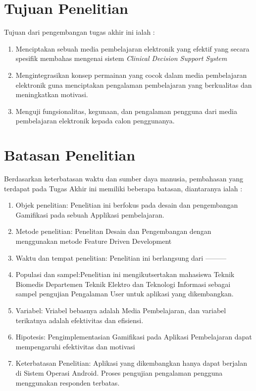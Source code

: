 
\section{Tujuan Penelitian}

Tujuan dari pengembangan tugas akhir ini ialah :
\begin{enumerate}
	\item Menciptakan sebuah media pembelajaran elektronik yang efektif yang secara spesifik membahas mengenai sistem \textit{Clinical Decision Support System}
	\item Mengintegrasikan konsep permainan yang cocok dalam media pembelajaran elektronik guna menciptakan pengalaman pembelajaran yang berkualitas dan meningkatkan motivasi.
	\item Menguji fungsionalitas, kegunaan, dan pengalaman pengguna dari media pembelajaran elektronik kepada calon penggunanya.
\end{enumerate}
\newpage
\section{Batasan Penelitian}
Berdasarkan keterbatasan waktu dan sumber daya manusia, pembahasan yang terdapat pada Tugas Akhir ini memiliki beberapa batasan, diantaranya ialah :
\begin{enumerate}
\item Objek penelitian: Penelitian ini berfokus pada desain dan pengembangan Gamifikasi pada sebuah Applikasi pembelajaran.
\item Metode penelitian: Penelitan Desain dan Pengembangan dengan menggunakan metode Feature Driven Development
\item Waktu dan tempat penelitian: Penelitian ini berlangsung dari ---------
\item Populasi dan sampel:Penelitian ini mengikutsertakan mahasiswa Teknik Biomedis Departemen Teknik Elektro dan Teknologi Informasi sebagai sampel pengujian Pengalaman User untuk aplikasi yang dikembangkan.
\item Variabel: Vriabel bebasnya adalah Media Pembelajaran, dan variabel terikatnya adalah efektivitas dan efisiensi.
\item Hipotesis: Pengimplementasian Gamifikasi pada Aplikasi Pembelajaran dapat mempengaruhi efektivitas dan motivasi
\item Keterbatasan Penelitian: Aplikasi yang dikembangkan hanya dapat berjalan di Sistem Operasi Android. Proses pengujian pengalaman pengguna menggunakan responden terbatas.
\end{enumerate}

